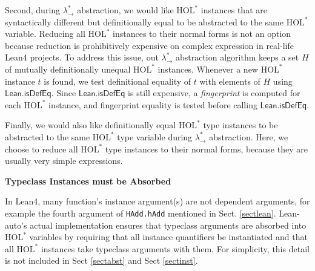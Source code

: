   Second, during $\lambda_\to^*$ abstraction, we would like $\text{HOL}^*$ instances
that are syntactically different but definitionally equal to be abstracted to the
same $\text{HOL}^*$ variable. Reducing all $\text{HOL}^*$ instances to their normal forms is
not an option because reduction is prohibitively expensive on complex
expression in real-life Lean4 projects. To address this issue, out $\lambda_\to^*$ abstraction algorithm keeps a
set $H$ of mutually definitionally unequal $\text{HOL}^*$ instances. Whenever a new $\text{HOL}^*$
instance $t$ is found, we test definitional equality of $t$ with elements of $H$
using $\mathsf{Lean.isDefEq}$. Since $\mathsf{Lean.isDefEq}$ is still expensive,
a \textit{fingerprint} is computed for each $\text{HOL}^*$ instance, and fingerprint equality
is tested before calling $\mathsf{Lean.isDefEq}$.

  Finally, we would also like definitionally equal $\text{HOL}^*$ type instances to
be abstracted to the same $\text{HOL}^*$ type variable during $\lambda_\to^*$ abstraction.
Here, we choose to reduce all $\text{HOL}^*$ type instances to their normal forms, because they
are usually very simple expressions.

\noindent \textbf{Typeclass Instances must be Absorbed}

  In Lean4, many function's instance argument(s) are not dependent arguments,
for example the fourth argument of \texttt{HAdd.hAdd} mentioned in Sect. \ref{sectlean}.
Lean-auto's actual implementation ensures that typeclass arguments are absorbed into
$\text{HOL}^*$ variables by requiring that all instance quantifiers be instantiated
and that all $\text{HOL}^*$ instances take typeclass arguments with them. For
simplicity, this detail is not included in Sect \ref{sectabst} and Sect \ref{sectinst}.
